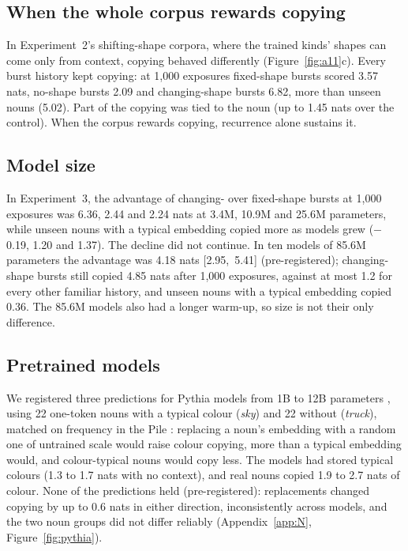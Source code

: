 \documentclass[11pt]{article}
\begin{document}
\subsection{When the whole corpus rewards copying}\label{sec:shifting}
In Experiment~2's shifting-shape corpora, where the trained kinds' shapes can come only from context, copying behaved differently (Figure~\ref{fig:a11}c). Every burst history kept copying: at 1,000 exposures fixed-shape bursts scored 3.57 nats, no-shape bursts 2.09 and changing-shape bursts 6.82, more than unseen nouns (5.02). Part of the copying was tied to the noun (up to 1.45 nats over the control). When the corpus rewards copying, recurrence alone sustains it.

\subsection{Model size}\label{sec:scale}
In Experiment~3, the advantage of changing- over fixed-shape bursts at 1,000 exposures was 6.36, 2.44 and 2.24 nats at 3.4M, 10.9M and 25.6M parameters, while unseen nouns with a typical embedding copied more as models grew ($-$0.19, 1.20 and 1.37). The decline did not continue. In ten models of 85.6M parameters the advantage was 4.18 nats [2.95,~5.41] (pre-registered); changing-shape bursts still copied 4.85 nats after 1,000 exposures, against at most 1.2 for every other familiar history, and unseen nouns with a typical embedding copied 0.36. The 85.6M models also had a longer warm-up, so size is not their only difference.

\subsection{Pretrained models}\label{sec:pythia}
We registered three predictions for Pythia models from 1B to 12B parameters \citep{biderman2023}, using 22 one-token nouns with a typical colour (\emph{sky}) and 22 without (\emph{truck}), matched on frequency in the Pile \citep{gao2020,liu2024infinigram}: replacing a noun's embedding with a random one of untrained scale would raise colour copying, more than a typical embedding would, and colour-typical nouns would copy less. The models had stored typical colours (1.3 to 1.7 nats with no context), and real nouns copied 1.9 to 2.7 nats of colour. None of the predictions held (pre-registered): replacements changed copying by up to 0.6 nats in either direction, inconsistently across models, and the two noun groups did not differ reliably (Appendix~\ref{app:N}, Figure~\ref{fig:pythia}).
\end{document}
